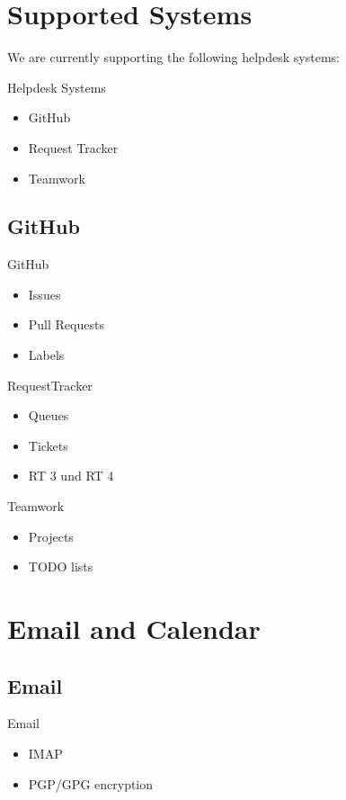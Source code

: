 \section{Supported Systems}

We are currently supporting the following helpdesk systems:

\begin{frame}{Helpdesk Systems}
\begin{itemize}
\item GitHub
\item Request Tracker
\item Teamwork
\end{itemize}
\end{frame}

\subsection{GitHub}


\begin{frame}{GitHub}
\begin{itemize}
\item Issues
\item Pull Requests
\item Labels
\end{itemize}
\end{frame}

\begin{frame}{RequestTracker}
\begin{itemize}
\item Queues
\item Tickets
\item RT 3 und RT 4
\end{itemize}
\end{frame}

\begin{frame}{Teamwork}
\begin{itemize}
\item Projects
\item TODO lists
\end{itemize}
\end{frame}

\section{Email and Calendar}
\subsection{Email}
\begin{frame}{Email}
\begin{itemize}
\item IMAP
\item PGP/GPG encryption
\end{itemize}
\end{frame}

